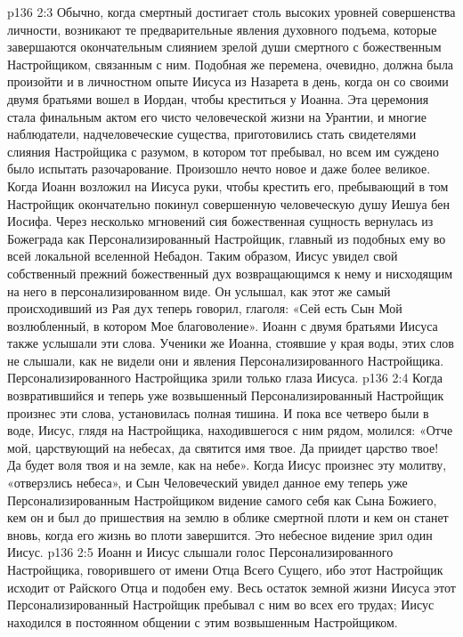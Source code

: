 \vs p136 2:3 Обычно, когда смертный достигает столь высоких уровней совершенства личности, возникают те предварительные явления духовного подъема, которые завершаются окончательным слиянием зрелой души смертного с божественным Настройщиком, связанным с ним. Подобная же перемена, очевидно, должна была произойти и в личностном опыте Иисуса из Назарета в день, когда он со своими двумя братьями вошел в Иордан, чтобы креститься у Иоанна. Эта церемония стала финальным актом его чисто человеческой жизни на Урантии, и многие наблюдатели, надчеловеческие существа, приготовились стать свидетелями слияния Настройщика с разумом, в котором тот пребывал, но всем им суждено было испытать разочарование. Произошло нечто новое и даже более великое. Когда Иоанн возложил на Иисуса руки, чтобы крестить его, пребывающий в том Настройщик окончательно покинул совершенную человеческую душу Иешуа бен Иосифа. Через несколько мгновений сия божественная сущность вернулась из Божеграда как Персонализированный Настройщик, главный из подобных ему во всей локальной вселенной Небадон. Таким образом, Иисус увидел свой собственный прежний божественный дух возвращающимся к нему и нисходящим на него в персонализированном виде. Он услышал, как этот же самый происходивший из Рая дух теперь говорил, глаголя: «Сей есть Сын Мой возлюбленный, в котором Мое благоволение». Иоанн с двумя братьями Иисуса также услышали эти слова. Ученики же Иоанна, стоявшие у края воды, этих слов не слышали, как не видели они и явления Персонализированного Настройщика. Персонализированного Настройщика зрили только глаза Иисуса.
\vs p136 2:4 \pc Когда возвратившийся и теперь уже возвышенный Персонализированный Настройщик произнес эти слова, установилась полная тишина. И пока все четверо были в воде, Иисус, глядя на Настройщика, находившегося с ним рядом, молился: «Отче мой, царствующий на небесах, да святится имя твое. Да приидет царство твое! Да будет воля твоя и на земле, как на небе». Когда Иисус произнес эту молитву, «отверзлись небеса», и Сын Человеческий увидел данное ему теперь уже Персонализированным Настройщиком видение самого себя как Сына Божиего, кем он и был до пришествия на землю в облике смертной плоти и кем он станет вновь, когда его жизнь во плоти завершится. Это небесное видение зрил один Иисус.
\vs p136 2:5 Иоанн и Иисус слышали голос Персонализированного Настройщика, говорившего от имени Отца Всего Сущего, ибо этот Настройщик исходит от Райского Отца и подобен ему. Весь остаток земной жизни Иисуса этот Персонализированный Настройщик пребывал с ним во всех его трудах; Иисус находился в постоянном общении с этим возвышенным Настройщиком.
